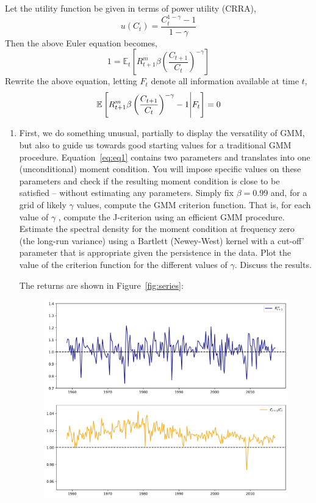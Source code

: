 \documentclass[12pt,twoside]{article}
\begin{document}
Let the utility function be given in terms of power utility (CRRA),
\[
    u(C_t) = \frac{C_t^{1-\gamma}-1}{1-\gamma}    
\]
Then the above Euler equation becomes,
\[
    1 = \mathbb{E}_t\left[R^m_{t+1}\beta\left(\frac{C_{t+1}}{C_t}\right)^{-\gamma}\right]
\]
Rewrite the above equation, letting \(F_t\) denote all information available at time \(t\),
\begin{equation}
    \label{eq:eq1}
    \mathbb{E}\left[R^m_{t+1}\beta\left(\frac{C_{t+1}}{C_t}\right)^{-\gamma}-1 \Bigg\vert F_t\right] = 0
\end{equation}
\begin{enumerate}[label = \Alph*)]
    \item First, we do something unusual, partially to display the versatility of GMM, but also to guide us towards good starting values for a traditional GMM procedure. Equation~\ref{eq:eq1} contains two parameters and translates into one (unconditional) moment condition. You will impose speciﬁc values on these parameters and check if the resulting moment condition is close to be satisﬁed – without estimating any parameters. Simply ﬁx \(\beta = 0.99\) and, for a grid of likely \(\gamma\) values, compute the GMM criterion function. That is, for each value of \(\gamma\) , compute the J-criterion using an eﬃcient GMM procedure. Estimate the spectral density for the moment condition at frequency zero (the long-run variance) using a Bartlett (Newey-West) kernel with a cut-off' parameter that is appropriate given the persistence in the data. Plot the value of the criterion function for the diﬀerent values of \(\gamma\). Discuss the results.
    \begin{solution}
        The returns are shown in Figure~\ref{fig:series}:
        \begin{figure}
            \centering
            \includegraphics[width = .8\textwidth]{images/series.jpg}

\end{figure}
\end{solution}
\end{enumerate}
\end{document}
